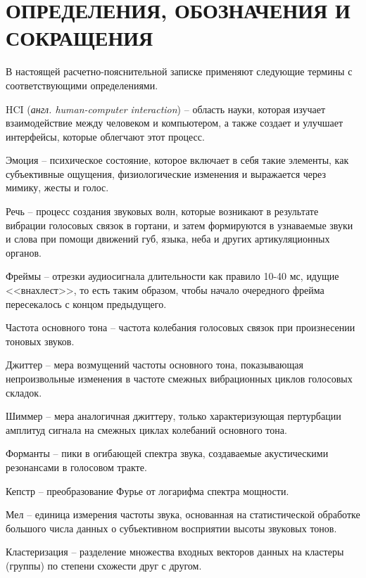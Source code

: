 \part*{ОПРЕДЕЛЕНИЯ, ОБОЗНАЧЕНИЯ И\\СОКРАЩЕНИЯ}

В настоящей расчетно-пояснительной записке применяют следующие термины с соответствующими определениями.

\begin{enumdescript}
	\item[HCI] (\textit{англ. human-computer interaction}) -- область науки, которая изучает взаимодействие между человеком и компьютером, а также создает и улучшает интерфейсы, которые облегчают этот процесс. 
	\item[Эмоция] -- психическое состояние, которое включает в себя такие элементы, как субъективные ощущения, физиологические изменения и выражается через мимику, жесты и голос. 
	\item[Речь] -- процесс создания звуковых волн, которые возникают в результате вибрации голосовых связок в гортани, и затем формируются в узнаваемые звуки и слова при помощи движений губ, языка, неба и других артикуляционных органов.
	\item[Фреймы] -- отрезки аудиосигнала длительности как правило 10-40 мс, идущие <<внахлест>>, то есть таким
	образом, чтобы начало очередного фрейма пересекалось с концом предыдущего. 
	\item[Частота основного тона] -- частота колебания голосовых связок при произнесении тоновых звуков.
	\item[Джиттер] -- мера возмущений частоты основного тона, показывающая непроизвольные изменения в частоте смежных вибрационных циклов голосовых складок.
	\item[Шиммер] -- мера аналогичная джиттеру, только характеризующая пертурбации амплитуд сигнала на смежных циклах колебаний основного тона.
	\item[Форманты] --  пики в огибающей спектра звука, создаваемые акустическими резонансами в голосовом тракте. 
	\item[Кепстр] -- преобразование Фурье от логарифма спектра мощности.
	\item[Мел] -- единица измерения частоты звука, основанная на статистической обработке большого числа данных о субъективном восприятии высоты звуковых тонов.
	\item[Кластеризация] -- разделение множества входных векторов данных на кластеры (группы) по степени схожести друг с другом.
\end{enumdescript}
